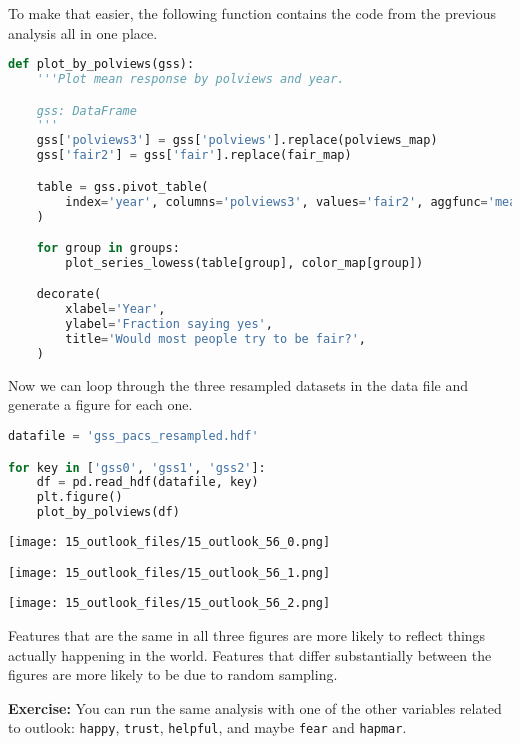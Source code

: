 \pagebreak

To make that easier, the following function contains the code from the
previous analysis all in one place.

\begin{lstlisting}[language=Python,style=source]
def plot_by_polviews(gss):
    '''Plot mean response by polviews and year.

    gss: DataFrame
    '''
    gss['polviews3'] = gss['polviews'].replace(polviews_map)
    gss['fair2'] = gss['fair'].replace(fair_map)

    table = gss.pivot_table(
        index='year', columns='polviews3', values='fair2', aggfunc='mean'
    )

    for group in groups:
        plot_series_lowess(table[group], color_map[group])

    decorate(
        xlabel='Year',
        ylabel='Fraction saying yes',
        title='Would most people try to be fair?',
    )
\end{lstlisting}

Now we can loop through the three resampled datasets in the data file
and generate a figure for each one.

\begin{lstlisting}[language=Python,style=source]
datafile = 'gss_pacs_resampled.hdf'

for key in ['gss0', 'gss1', 'gss2']:
    df = pd.read_hdf(datafile, key)
    plt.figure()
    plot_by_polviews(df)
\end{lstlisting}

\begin{center}
\texttt{[image: 15\_outlook\_files/15\_outlook\_56\_0.png]}
\end{center}

\begin{center}
\texttt{[image: 15\_outlook\_files/15\_outlook\_56\_1.png]}
\end{center}

\begin{center}
\texttt{[image: 15\_outlook\_files/15\_outlook\_56\_2.png]}
\end{center}

Features that are the same in all three figures are more likely to
reflect things actually happening in the world. Features that differ
substantially between the figures are more likely to be due to random
sampling.

\textbf{Exercise:} You can run the same analysis with one of the other
variables related to outlook: \passthrough{\lstinline!happy!},
\passthrough{\lstinline!trust!}, \passthrough{\lstinline!helpful!}, and
maybe \passthrough{\lstinline!fear!} and
\passthrough{\lstinline!hapmar!}.

